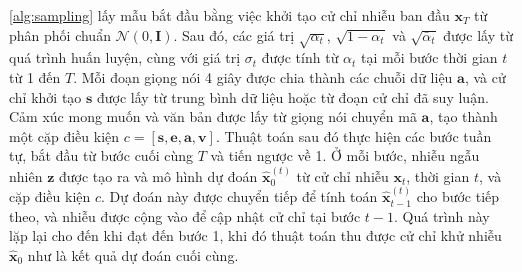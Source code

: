 \autoref{alg:sampling} lấy mẫu bắt đầu bằng việc khởi tạo cử chỉ nhiễu ban đầu $\mathbf{x}_T$ từ phân phối chuẩn $\mathcal{N}(0, \mathbf{I})$. Sau đó, các giá trị $\sqrt{\alpha_t}$, $\sqrt{1 - \alpha_t}$ và $\sqrt{\bar{\alpha}_t}$ được lấy từ quá trình huấn luyện, cùng với giá trị $\sigma_t$ được tính từ $\alpha_t$ tại mỗi bước thời gian $t$ từ 1 đến $T$. Mỗi đoạn giọng nói 4 giây được chia thành các chuỗi dữ liệu $\mathbf{a}$, và cử chỉ khởi tạo $\mathbf{s}$ được lấy từ trung bình dữ liệu hoặc từ đoạn cử chỉ đã suy luận. Cảm xúc mong muốn và văn bản được lấy từ giọng nói chuyển mã $\mathbf{a}$, tạo thành một cặp điều kiện $c = [\mathbf{s}, \mathbf{e}, \mathbf{a}, \mathbf{v}]$. Thuật toán sau đó thực hiện các bước tuần tự, bắt đầu từ bước cuối cùng $T$ và tiến ngược về 1. Ở mỗi bước, nhiễu ngẫu nhiên $\mathbf{z}$ được tạo ra và mô hình dự đoán $\hat{\mathbf{x}}_0^{(t)}$ từ cử chỉ nhiễu $\mathbf{x}_t$, thời gian $t$, và cặp điều kiện $c$. Dự đoán này được chuyển tiếp để tính toán $\hat{\mathbf{x}}_{t-1}^{(t)}$ cho bước tiếp theo, và nhiễu được cộng vào để cập nhật cử chỉ tại bước $t-1$. Quá trình này lặp lại cho đến khi đạt đến bước 1, khi đó thuật toán thu được cử chỉ khử nhiễu $\hat{\mathbf{x}}_0$ như là kết quả dự đoán cuối cùng.
